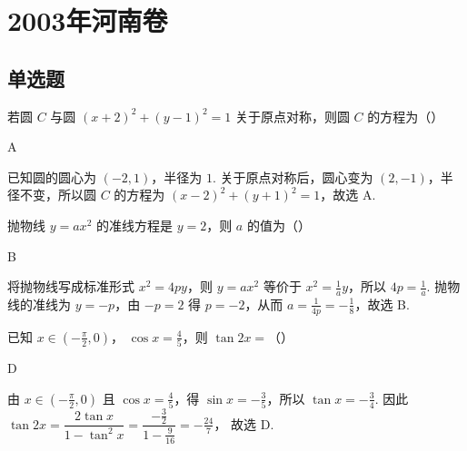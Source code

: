 \chapter{2003年河南卷}
\section{单选题}
\begin{problem}
若圆 \(C\) 与圆 \( (x+2)^{2}+(y-1)^{2}=1 \) 关于原点对称，则圆 \(C\) 的方程为（\quad）
\begin{answer}
A
\end{answer}

\begin{solution}
已知圆的圆心为 \((-2,1)\)，半径为 \(1\). 关于原点对称后，圆心变为 \((2,-1)\)，半径不变，所以圆 \(C\) 的方程为 \((x-2)^{2}+(y+1)^{2}=1\)，故选 A.
\end{solution}
\end{problem}

\begin{problem}
抛物线 \(y=ax^{2}\) 的准线方程是 \(y=2\)，则 \(a\) 的值为（\quad）
\begin{answer}
B
\end{answer}

\begin{solution}
将抛物线写成标准形式 \(x^{2}=4py\)，则 \(y=ax^{2}\) 等价于 \(x^{2}=\frac{1}{a}y\)，所以 \(4p=\frac{1}{a}\). 抛物线的准线为 \(y=-p\)，由 \(-p=2\) 得 \(p=-2\)，从而 \(a=\frac{1}{4p}=-\frac{1}{8}\)，故选 B.
\end{solution}
\end{problem}

\begin{problem}
已知 \( x \in \left(-\frac{\pi}{2}, 0\right) \)， \( \cos x = \frac{4}{5} \)，则 \( \tan 2x = \)（\quad）
\begin{answer}
D
\end{answer}

\begin{solution}
由 \(x\in\left(-\frac{\pi}{2},0\right)\) 且 \(\cos x=\frac{4}{5}\)，得 \(\sin x=-\frac{3}{5}\)，所以 \(\tan x=-\frac{3}{4}\). 因此
\(\tan 2x=\dfrac{2\tan x}{1-\tan^{2}x}=\dfrac{-\frac{3}{2}}{1-\frac{9}{16}}=-\frac{24}{7}\)，
故选 D.
\end{solution}
\end{problem}

